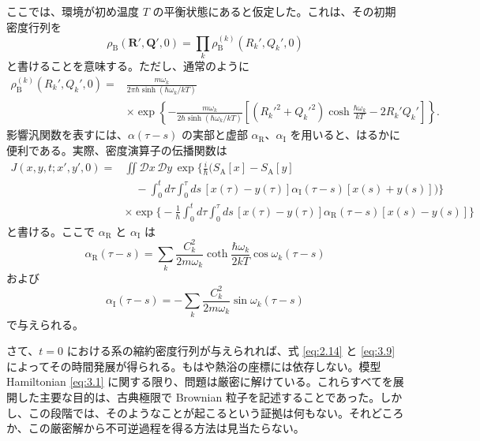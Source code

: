 ここでは、環境が初め温度 $T$ の平衡状態にあると仮定した。これは、その初期密度行列を
\begin{equation}
 \rho_{\mathrm B}(\bm R',\bm Q',0)
 =\prod_k\rho_{\mathrm B}^{(k)}(R_k',Q_k',0)
 \tag{3.7}\label{eq:3.7}
\end{equation}
と書けることを意味する。ただし、通常のように
\begin{equation}
 \begin{aligned}
 \rho_{\mathrm B}^{(k)}(R_k',Q_k',0)
 ={}&\frac{m\omega_k}{2\pi\hbar\sinh(\hbar\omega_k/kT)}\\
 &\times\exp\left\{-\frac{m\omega_k}{2\hbar\sinh(\hbar\omega_k/kT)}
 \left[(R_k'^2+Q_k'^2)\cosh\frac{\hbar\omega_k}{kT}-2R_k'Q_k'\right]\right\}.
 \end{aligned}
 \tag{3.8}\label{eq:3.8}
\end{equation}
影響汎関数を表すには、$\alpha(\tau-s)$ の実部と虚部 $\alpha_{\mathrm R}$、$\alpha_{\mathrm I}$ を用いると、はるかに便利である。実際、密度演算子の伝播関数は
\begin{equation}
 \begin{aligned}
 J(x,y,t;x',y',0)={}&\iint\mathcal D x\,\mathcal D y\,
 \exp\biggl\{\frac{i}{\hbar}\biggl(S_{\mathrm A}[x]-S_{\mathrm A}[y]\\
 &\quad-\int_0^t d\tau\int_0^\tau ds\,
 [x(\tau)-y(\tau)]\alpha_{\mathrm I}(\tau-s)[x(s)+y(s)]\biggr)\biggr\}\\
 &\times\exp\biggl\{-\frac1\hbar\int_0^t d\tau\int_0^\tau ds\,
 [x(\tau)-y(\tau)]\alpha_{\mathrm R}(\tau-s)[x(s)-y(s)]\biggr\}
 \end{aligned}
 \tag{3.9}\label{eq:3.9}
\end{equation}
と書ける。ここで $\alpha_{\mathrm R}$ と $\alpha_{\mathrm I}$ は
\begin{equation}
 \alpha_{\mathrm R}(\tau-s)=\sum_k\frac{C_k^2}{2m\omega_k}
 \coth\frac{\hbar\omega_k}{2kT}\cos\omega_k(\tau-s)
 \tag{3.10}\label{eq:3.10}
\end{equation}
および
\begin{equation}
 \alpha_{\mathrm I}(\tau-s)=-\sum_k\frac{C_k^2}{2m\omega_k}
 \sin\omega_k(\tau-s)
 \tag{3.11}\label{eq:3.11}
\end{equation}
で与えられる。

さて、$t=0$ における系の縮約密度行列が与えられれば、式 \eqref{eq:2.14} と \eqref{eq:3.9} によってその時間発展が得られる。もはや熱浴の座標には依存しない。模型 Hamiltonian \eqref{eq:3.1} に関する限り、問題は厳密に解けている。これらすべてを展開した主要な目的は、古典極限で Brownian 粒子を記述することであった。しかし、この段階では、そのようなことが起こるという証拠は何もない。それどころか、この厳密解から不可逆過程を得る方法は見当たらない。

